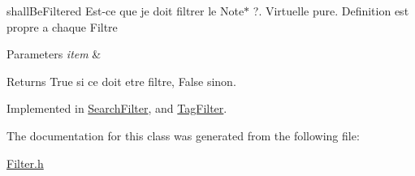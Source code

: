 shall\-Be\-Filtered Est-\/ce que je doit filtrer le Note$\ast$ ?. Virtuelle pure. Definition est propre a chaque Filtre 


\begin{DoxyParams}{Parameters}
{\em item} & \\
\hline
\end{DoxyParams}
\begin{DoxyReturn}{Returns}
True si ce  doit etre filtre, False sinon. 
\end{DoxyReturn}


Implemented in \hyperlink{class_search_filter_a7b3443afaa52644460273e2facd04005}{Search\-Filter}, and \hyperlink{class_tag_filter_a488d669b40c37a1e489a9b25f69a3f23}{Tag\-Filter}.



The documentation for this class was generated from the following file\-:\begin{DoxyCompactItemize}
\item 
\hyperlink{_filter_8h}{Filter.\-h}\end{DoxyCompactItemize}
